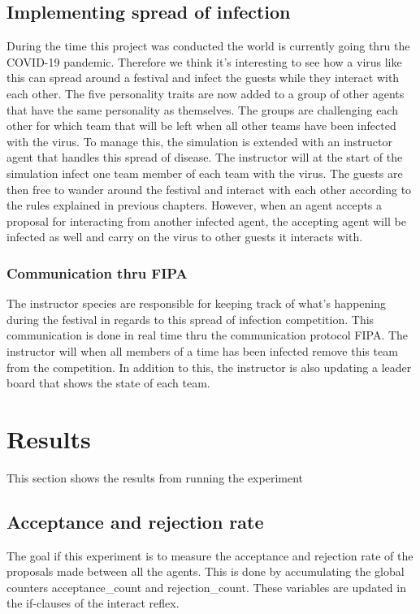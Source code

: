 \documentclass[a4paper,10pt]{article}
\begin{document}
\subsection{Implementing spread of infection}
During the time this project was conducted the world is currently going thru the COVID-19 pandemic. Therefore we think it’s interesting to see how a virus like this can spread around a festival and infect the guests while they interact with each other.
The five personality traits are now added to a group of other agents that have the same personality as themselves. The groups are challenging each other for which team that will be left when all other teams have been infected with the virus. To manage this, the simulation is extended with an instructor agent that handles this spread of disease. The instructor will at the start of the simulation infect one team member of each team with the virus. The guests are then free to wander around the festival and interact with each other according to the rules explained in previous chapters. However, when an agent accepts a proposal for interacting from another infected agent, the accepting agent will be infected as well and carry on the virus to other guests it interacts with.  

\subsubsection{Communication thru FIPA}
The instructor species are responsible for keeping track of what’s happening during the festival in regards to this spread of infection competition. This communication is done in real time thru the communication protocol FIPA. The instructor will when all members of a time has been infected remove this team from the competition. In addition to this, the instructor is also updating a leader board that shows the state of each team. 

\section{Results}

This section shows the results from running the experiment

\subsection{Acceptance and rejection rate}

The goal if this experiment is to measure the acceptance and rejection rate of the proposals made between all the agents. This is done by accumulating the global counters acceptance\_count and rejection\_count. These variables are updated in the if-clauses of the interact reflex. 
\end{document}
